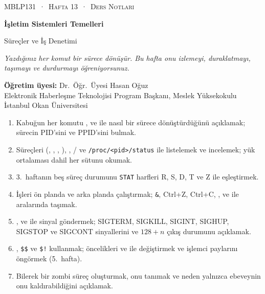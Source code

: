 \setlength{\emergencystretch}{3em}
\lstset{tabsize=8}
\thispagestyle{empty}
\begin{tcolorbox}[enhanced,colback=dark,colframe=dark,arc=0pt,boxrule=0pt,
  left=18pt,right=18pt,top=20pt,bottom=20pt,coltext=white]
{\small\color{mint}\textsc{MBLP131 \,·\, Hafta 13 \,·\, Ders Notları}}\par\medskip
{\headfont\fontsize{26}{30}\selectfont\bfseries İşletim Sistemleri Temelleri}\par\medskip
{\large Süreçler ve İş Denetimi}\par\smallskip
{\small\itshape\color{white!70} Yazdığınız her komut bir sürece dönüşür. Bu hafta onu izlemeyi, duraklatmayı, taşımayı ve durdurmayı öğreniyorsunuz.}
\end{tcolorbox}

\vspace{0.4em}
\begin{minipage}[t]{0.70\linewidth}
\small
\textbf{Öğretim üyesi:} Dr.\ Öğr.\ Üyesi Hasan Oğuz\\
Elektronik Haberleşme Teknolojisi Program Başkanı, Meslek Yüksekokulu\\
İstanbul Okan Üniversitesi
\end{minipage}

\vspace{0.8em}
\begin{keyidea}
\begin{enumerate}[leftmargin=1.4em]
  \item Kabuğun her komutu ,  ve  ile nasıl bir sürece dönüştürdüğünü açıklamak; sürecin PID'sini ve PPID'sini bulmak.
  \item Süreçleri  (, , , ), , / ve \texttt{/proc/<pid>/status} ile listelemek ve incelemek; yük ortalaması dahil her sütunu okumak.
  \item 3.~haftanın beş süreç durumunu \texttt{STAT} harfleri R, S, D, T ve Z ile eşleştirmek.
  \item İşleri ön planda ve arka planda çalıştırmak; \texttt{\&}, Ctrl+Z, Ctrl+C, ,  ve  ile aralarında taşımak.
  \item {},  ve  ile sinyal göndermek; SIGTERM, SIGKILL, SIGINT, SIGHUP, SIGSTOP ve SIGCONT sinyallerini ve $128 + n$ çıkış durumunu açıklamak.
  \item {}, \verb|$$| ve \verb|$!| kullanmak; öncelikleri  ve  ile değiştirmek ve işlemci paylarını öngörmek (5.~hafta).
  \item Bilerek bir zombi süreç oluşturmak, onu tanımak ve neden yalnızca ebeveynin onu kaldırabildiğini açıklamak.
\end{enumerate}
\end{keyidea}

